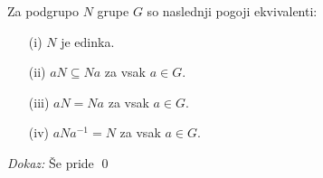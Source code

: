 \begin{trditev}
    Za podgrupo $N$ grupe $G$ so naslednji pogoji ekvivalenti:
    \begin{itemize}
    \item[\rm (i)] $N$ je edinka.
    \item[\rm (ii)] $aN \subseteq Na$ za vsak $a \in G$.
    \item[\rm (iii)] $aN = Na$ za vsak $a \in G$.
    \item[\rm (iv)] $aNa^{-1} = N$ za vsak $a \in G$. 
    \end{itemize}
\end{trditev}

\noindent
{\em Dokaz:\/}
    Še pride
\qed